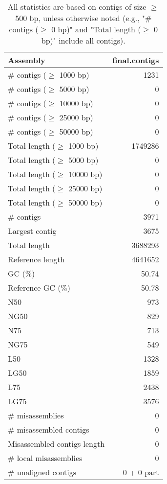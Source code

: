 \documentclass[12pt,a4paper]{article}
\begin{document}
\begin{table}[ht]
\begin{center}
\caption{All statistics are based on contigs of size $\geq$ 500 bp, unless otherwise noted (e.g., "\# contigs ($\geq$ 0 bp)" and "Total length ($\geq$ 0 bp)" include all contigs).}
\begin{tabular}{|l*{1}{|r}|}
\hline
Assembly & final.contigs \\ \hline
\# contigs ($\geq$ 1000 bp) & 1231 \\ \hline
\# contigs ($\geq$ 5000 bp) & 0 \\ \hline
\# contigs ($\geq$ 10000 bp) & 0 \\ \hline
\# contigs ($\geq$ 25000 bp) & 0 \\ \hline
\# contigs ($\geq$ 50000 bp) & 0 \\ \hline
Total length ($\geq$ 1000 bp) & 1749286 \\ \hline
Total length ($\geq$ 5000 bp) & 0 \\ \hline
Total length ($\geq$ 10000 bp) & 0 \\ \hline
Total length ($\geq$ 25000 bp) & 0 \\ \hline
Total length ($\geq$ 50000 bp) & 0 \\ \hline
\# contigs & 3971 \\ \hline
Largest contig & 3675 \\ \hline
Total length & 3688293 \\ \hline
Reference length & 4641652 \\ \hline
GC (\%) & 50.74 \\ \hline
Reference GC (\%) & 50.78 \\ \hline
N50 & 973 \\ \hline
NG50 & 829 \\ \hline
N75 & 713 \\ \hline
NG75 & 549 \\ \hline
L50 & 1328 \\ \hline
LG50 & 1859 \\ \hline
L75 & 2438 \\ \hline
LG75 & 3576 \\ \hline
\# misassemblies & 0 \\ \hline
\# misassembled contigs & 0 \\ \hline
Misassembled contigs length & 0 \\ \hline
\# local misassemblies & 0 \\ \hline
\# unaligned contigs & 0 + 0 part \\ \hline

\end{tabular}
\end{center}
\end{table}
\end{document}
